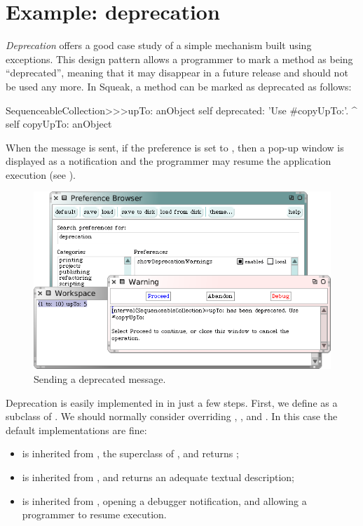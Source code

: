 \documentclass[a4paper,10pt,twoside]{book}
\begin{document}
\section{Example: deprecation}

\emph{Deprecation} offers a good case study of a simple mechanism built using exceptions.
This design pattern allows a programmer to mark a method as being ``deprecated'', meaning that it may disappear in a future release and should not be used any more. In Squeak, a method can be marked as deprecated as follows:

\begin{code}{}
SequenceableCollection>>>upTo: anObject
	self deprecated: 'Use #copyUpTo:'.
	^ self copyUpTo: anObject
\end{code}

When the message  is sent, if the  preference is set to , then a pop-up window is displayed as a notification and the programmer may resume the application execution (see ).


\begin{figure}[ht]\centering
        \includegraphics[width=.8\linewidth]{Deprecation}
        \caption{Sending a deprecated message.}
\end{figure}

Deprecation is easily implemented in \squeak in just a few steps.
First, we define  as a subclass of .
We should normally consider overriding , , and . In this case the default implementations are fine:

\begin{itemize}
\item {} is inherited from , the superclass of , and returns ;
\item {} is inherited from , and returns an adequate textual description;
\item {} is inherited from , opening a debugger notification, and allowing a programmer to resume execution.
\end{itemize}
\end{document}

